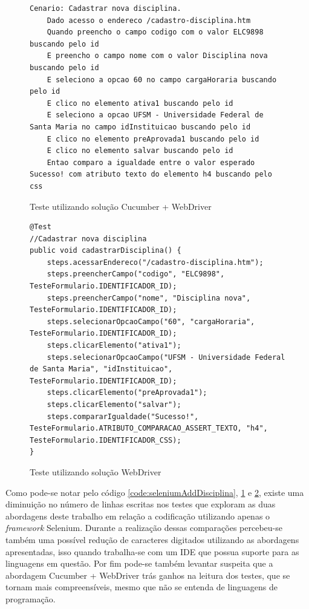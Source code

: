 \documentclass[tg]{mdtufsm}
\begin{document}
\begin{figure}[!htt]
	\begin{lstlisting}
Cenario: Cadastrar nova disciplina.
    Dado acesso o endereco /cadastro-disciplina.htm
    Quando preencho o campo codigo com o valor ELC9898 buscando pelo id
    E preencho o campo nome com o valor Disciplina nova buscando pelo id
    E seleciono a opcao 60 no campo cargaHoraria buscando pelo id
    E clico no elemento ativa1 buscando pelo id
    E seleciono a opcao UFSM - Universidade Federal de Santa Maria no campo idInstituicao buscando pelo id
    E clico no elemento preAprovada1 buscando pelo id
    E clico no elemento salvar buscando pelo id
    Entao comparo a igualdade entre o valor esperado Sucesso! com atributo texto do elemento h4 buscando pelo css
	\end{lstlisting}
	\caption{Teste utilizando solução Cucumber + WebDriver}
	\label{code:solucao2AddDisciplina}
\end{figure}

\begin{figure}[!htt]
	\begin{lstlisting}
@Test
//Cadastrar nova disciplina
public void cadastrarDisciplina() {
    steps.acessarEndereco("/cadastro-disciplina.htm");
    steps.preencherCampo("codigo", "ELC9898", TesteFormulario.IDENTIFICADOR_ID);
    steps.preencherCampo("nome", "Disciplina nova", TesteFormulario.IDENTIFICADOR_ID);
    steps.selecionarOpcaoCampo("60", "cargaHoraria", TesteFormulario.IDENTIFICADOR_ID);
    steps.clicarElemento("ativa1");
    steps.selecionarOpcaoCampo("UFSM - Universidade Federal de Santa Maria", "idInstituicao", TesteFormulario.IDENTIFICADOR_ID);
    steps.clicarElemento("preAprovada1");
    steps.clicarElemento("salvar");
    steps.compararIgualdade("Sucesso!", TesteFormulario.ATRIBUTO_COMPARACAO_ASSERT_TEXTO, "h4", TesteFormulario.IDENTIFICADOR_CSS);
}
	\end{lstlisting}
	\caption{Teste utilizando solução WebDriver}
	\label{code:solucao3AddDisciplina}
\end{figure}

Como pode-se notar pelo código \ref{code:seleniumAddDisciplina}, \ref{code:solucao2AddDisciplina} e \ref{code:solucao3AddDisciplina}, existe uma diminuição no número de linhas
escritas nos testes que exploram as duas abordagens deste trabalho em relação a codificação utilizando apenas o \emph{framework} Selenium. Durante a realização dessas
comparações percebeu-se também uma possível redução de caracteres digitados utilizando as abordagens apresentadas, isso quando trabalha-se com um IDE que possua suporte
para as linguagens em questão. Por fim pode-se também levantar suspeita que a abordagem Cucumber + WebDriver trás ganhos na leitura dos testes, que se tornam mais
compreensíveis, mesmo que não se entenda de linguagens de programação.
\end{document}
